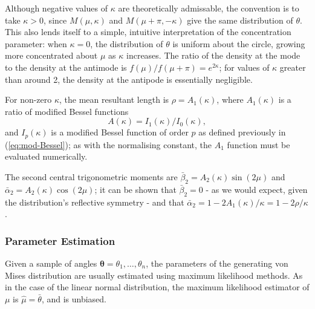 \documentclass[../../ArchStats.tex]{subfiles}
\begin{document}

Although negative values of $\kappa$ are theoretically admissable, the convention is to take $\kappa > 0$, since $M(\mu, \kappa)$ and $M(\mu + \pi, -\kappa)$ give the same distribution of $\theta$. This also lends itself to a simple, intuitive interpretation of the concentration parameter: when $\kappa = 0$, the distribution of $\theta$ is uniform about the circle, growing more concentrated about $\mu$ as $\kappa$ increases.  The ratio of the density at the mode to the density at the antimode is $f(\mu) / f(\mu + \pi) = e^{2\kappa}$; for values of $\kappa$ greater than around 2, the density at the antipode is essentially negligible. 


For non-zero $\kappa$, the mean resultant length is $\rho = A_1(\kappa)$, where $A_1(\kappa)$ is a ratio of modified Bessel functions
\[A(\kappa) = I_1(\kappa)/I_0(\kappa),\]
and $I_p(\kappa)$ is a modified Bessel function of order $p$ as defined previously in (\ref{eq:mod-Bessel}); as with the normalising constant, the $A_1$ function must be evaluated numerically. 

The second central trigonometric moments are $\bar{\beta}_2 = A_2(\kappa) \sin(2\mu)$ and $\bar{\alpha}_2 = A_2(\kappa) \cos(2\mu)$; it can be shown that $\bar{\beta}_2 = 0$ - as we would expect, given the distribution's reflective symmetry - and that $\bar{\alpha}_2 = 1 - 2A_1(\kappa)/\kappa = 1-2\rho/\kappa$.




\subsubsection{Parameter Estimation}

Given a sample of angles $\boldsymbol{\theta} = \theta_1, \dots, \theta_n$,  the parameters of the generating von Mises distribution are usually estimated using maximum likelihood methods. As in the case of the linear normal distribution, the maximum likelihood estimator of $\mu$ is $\hat{\mu} = \bar{\theta}$, and is unbiased.
\end{document}
